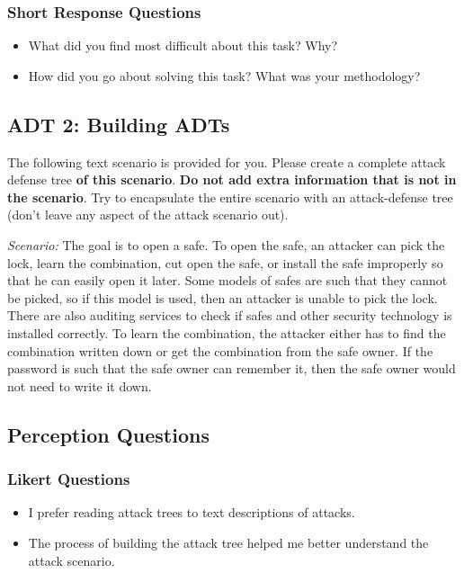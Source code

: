 \subsubsection*{Short Response Questions}
\begin{itemize}
  \setlength{\itemindent}{\qIndent}
  \item[\surveyq{LS-ADT1-W1}] What did you find most difficult about this task? Why?
  \item[\surveyq{LS-ADT1-W2}] How did you go about solving this task? What was your methodology?
\end{itemize}



\subsection*{ADT 2: Building ADTs}

The following text scenario is provided for you. Please create a complete attack defense tree \textbf{of this scenario}. \textbf{Do not add extra information that is not in the scenario}. Try to encapsulate the entire scenario with an attack-defense tree (don't leave any aspect of the attack scenario out).

\emph{Scenario:} 
The goal is to open a safe. To open the safe, an attacker can pick the lock,
learn the combination, cut open the safe, or install the safe improperly so
that he can easily open it later. Some models of safes are such that they cannot be picked, so if this model is used, then an attacker is unable to pick the lock. There are also auditing services to check if safes and other security technology is installed correctly. To learn the combination, the attacker
either has to find the combination written down or get the combination
from the safe owner. If the password is such that the safe owner can remember it, then the safe owner would not need to write it down.



\subsection*{Perception Questions}

\subsubsection*{Likert Questions}
\begin{itemize}
  \setlength{\itemindent}{\qIndent}
  \item[\surveyq{LS-ADT2-L1}] I prefer reading attack trees to text descriptions of attacks.
  \item[\surveyq{LS-ADT2-L2}] The process of building the attack tree helped me better understand the attack scenario.
\end{itemize}

